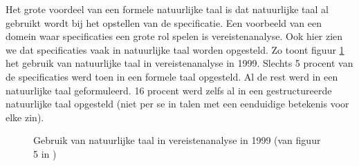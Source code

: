 
Het grote voordeel van een formele natuurlijke taal is dat natuurlijke taal al gebruikt wordt bij het opstellen van de specificatie. Een voorbeeld van een domein waar specificaties een grote rol spelen is vereistenanalyse. Ook hier zien we dat specificaties vaak in natuurlijke taal worden opgesteld. Zo toont figuur \ref{fig:natural-language-use} het gebruik van natuurlijke taal in vereistenanalyse in 1999. Slechts 5 procent van de specificaties werd toen in een formele taal opgesteld. Al de rest werd in een natuurlijke taal geformuleerd. 16 procent werd zelfs al in een gestructureerde natuurlijke taal opgesteld (niet per se in talen met een eenduidige betekenis voor elke zin).

\begin{figure}
  \label{fig:natural-language-use}
  \caption[Gebruik van natuurlijke taal in vereistenanalyse]{Gebruik van natuurlijke taal in vereistenanalyse in 1999 (van figuur 5 in \cite{Luisa2004})}
\end{figure}


